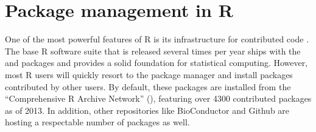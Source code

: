 



\section{Package management in R}

One of the most powerful features of R is its infrastructure for contributed
code \citep{fox2009aspects}. The base R software suite that is released several
times per year ships with the  and  packages and
provides a solid foundation for statistical computing. However, most R users
will quickly resort to the package manager and install packages contributed by
other users. By default, these packages are installed from the ``Comprehensive
R Archive Network'' (), featuring over 4300 contributed packages as
of 2013. In addition, other repositories like BioConductor \citep{bioc} and
Github \citep{dabbish2012social} are hosting a respectable number of packages
as well.

